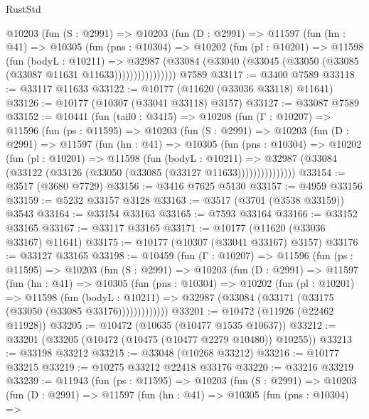 \begin{lexlean}{RustStd}
\begin{coremodule}
          @10203
            (fun (S : @2991) =>
            @10203
              (fun (D : @2991) =>
              @11597
                (fun (hn : @41) =>
                @10305
                  (fun (pns : @10304) =>
                  @10202
                    (fun (pl : @10201) =>
                    @11598
                      (fun (bodyL : @10211) =>
                      @32987
                        (@33084
                          (@33040 (@33045 (@33050 (@33085 (@33087 @11631 @11633))))))))))))))))
    @7589
@33117 := @3400 @7589
@33118 := @33117 @11633
@33122 := @10177 (@11620 (@33036 @33118) @11641)
@33126 := @10177 (@10307 (@33041 @33118) @3157)
@33127 := @33087 @7589
@33152 := @10441
    (fun (tail0 : @3415) =>
    @10208
      (fun (Γ : @10207) =>
      @11596
        (fun (ps : @11595) =>
        @10203
          (fun (S : @2991) =>
          @10203
            (fun (D : @2991) =>
            @11597
              (fun (hn : @41) =>
              @10305
                (fun (pns : @10304) =>
                @10202
                  (fun (pl : @10201) =>
                  @11598
                    (fun (bodyL : @10211) =>
                    @32987 (@33084 (@33122 (@33126 (@33050 (@33085 (@33127 @11633)))))))))))))))
@33154 := @3517 (@3680 @7729)
@33156 := @3416 @7625 @5130
@33157 := @4959 @33156
@33159 := @5232 @33157 @3128
@33163 := @3517 (@3701 (@3538 @33159)) @3543
@33164 := @33154 @33163
@33165 := @7593 @33164
@33166 := @33152 @33165
@33167 := @33117 @33165
@33171 := @10177 (@11620 (@33036 @33167) @11641)
@33175 := @10177 (@10307 (@33041 @33167) @3157)
@33176 := @33127 @33165
@33198 := @10459
    (fun (Γ : @10207) =>
    @11596
      (fun (ps : @11595) =>
      @10203
        (fun (S : @2991) =>
        @10203
          (fun (D : @2991) =>
          @11597
            (fun (hn : @41) =>
            @10305
              (fun (pns : @10304) =>
              @10202
                (fun (pl : @10201) =>
                @11598
                  (fun (bodyL : @10211) =>
                  @32987 (@33084 (@33171 (@33175 (@33050 (@33085 @33176)))))))))))))
@33201 := @10472 (@11926 (@22462 @11928))
@33205 := @10472 (@10635 (@10477 @1535 @10637))
@33212 := @33201 (@33205 (@10472 (@10475 (@10477 @2279 @10480)) @10255))
@33213 := @33198 @33212
@33215 := @33048 (@10268 @33212)
@33216 := @10177 @33215
@33219 := @10275 @33212 @22418 @33176
@33220 := @33216 @33219
@33239 := @11943
    (fun (ps : @11595) =>
    @10203
      (fun (S : @2991) =>
      @10203
        (fun (D : @2991) =>
        @11597
          (fun (hn : @41) =>
          @10305
            (fun (pns : @10304) =>

\end{coremodule}
\end{lexlean}
